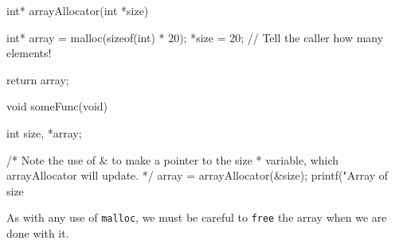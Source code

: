 \begin{codeblock}
int* arrayAllocator(int *size) {
    int* array = malloc(sizeof(int) * 20);
    *size = 20; // Tell the caller how many elements!

    return array;
}

void someFunc(void) {
    int size, *array;

    /* Note the use of & to make a pointer to the size
     * variable, which arrayAllocator will update.
     */
    array = arrayAllocator(&size);
    printf("Array of size %
}
\end{codeblock}

As with any use of \lstinline!malloc!, we must be careful to \lstinline!free! the array when we are done with it.
